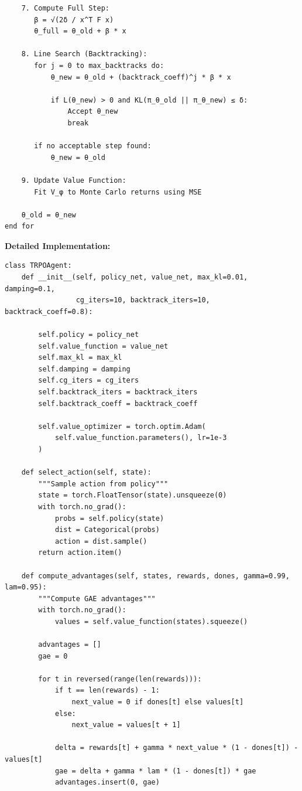 \documentclass[12pt]{article}
\begin{document}
{{\begin{verbatim}
    7. Compute Full Step:
       β = √(2δ / x^T F x)
       θ_full = θ_old + β * x

    8. Line Search (Backtracking):
       for j = 0 to max_backtracks do:
           θ_new = θ_old + (backtrack_coeff)^j * β * x

           if L(θ_new) > 0 and KL(π_θ_old || π_θ_new) ≤ δ:
               Accept θ_new
               break

       if no acceptable step found:
           θ_new = θ_old

    9. Update Value Function:
       Fit V_φ to Monte Carlo returns using MSE

    θ_old = θ_new
end for
\end{verbatim}

\textbf{Detailed Implementation:}

\begin{verbatim}
class TRPOAgent:
    def __init__(self, policy_net, value_net, max_kl=0.01, damping=0.1, 
                 cg_iters=10, backtrack_iters=10, backtrack_coeff=0.8):
        
        self.policy = policy_net
        self.value_function = value_net
        self.max_kl = max_kl
        self.damping = damping
        self.cg_iters = cg_iters
        self.backtrack_iters = backtrack_iters
        self.backtrack_coeff = backtrack_coeff

        self.value_optimizer = torch.optim.Adam(
            self.value_function.parameters(), lr=1e-3
        )

    def select_action(self, state):
        """Sample action from policy"""
        state = torch.FloatTensor(state).unsqueeze(0)
        with torch.no_grad():
            probs = self.policy(state)
            dist = Categorical(probs)
            action = dist.sample()
        return action.item()

    def compute_advantages(self, states, rewards, dones, gamma=0.99, lam=0.95):
        """Compute GAE advantages"""
        with torch.no_grad():
            values = self.value_function(states).squeeze()

        advantages = []
        gae = 0

        for t in reversed(range(len(rewards))):
            if t == len(rewards) - 1:
                next_value = 0 if dones[t] else values[t]
            else:
                next_value = values[t + 1]

            delta = rewards[t] + gamma * next_value * (1 - dones[t]) - values[t]
            gae = delta + gamma * lam * (1 - dones[t]) * gae
            advantages.insert(0, gae)


\end{verbatim}}}
\end{document}
